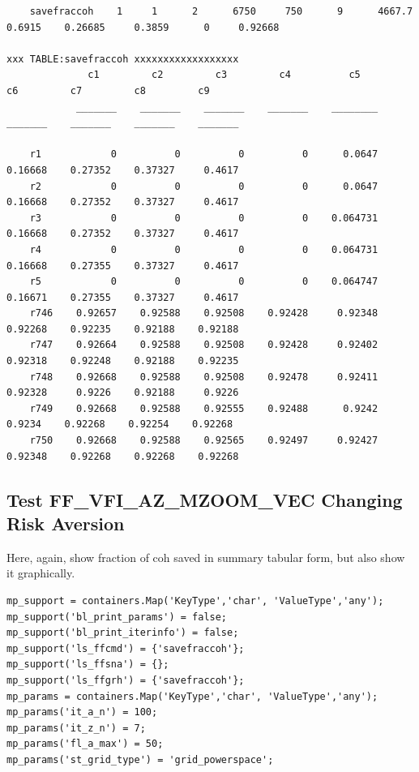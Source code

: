 \documentclass[
]{book}
\begin{document}
\begin{verbatim}
    savefraccoh    1     1      2      6750     750      9      4667.7    0.6915    0.26685     0.3859      0     0.92668

xxx TABLE:savefraccoh xxxxxxxxxxxxxxxxxx
              c1         c2         c3         c4          c5         c6         c7         c8         c9   
            _______    _______    _______    _______    ________    _______    _______    _______    _______

    r1            0          0          0          0      0.0647    0.16668    0.27352    0.37327     0.4617
    r2            0          0          0          0      0.0647    0.16668    0.27352    0.37327     0.4617
    r3            0          0          0          0    0.064731    0.16668    0.27352    0.37327     0.4617
    r4            0          0          0          0    0.064731    0.16668    0.27355    0.37327     0.4617
    r5            0          0          0          0    0.064747    0.16671    0.27355    0.37327     0.4617
    r746    0.92657    0.92588    0.92508    0.92428     0.92348    0.92268    0.92235    0.92188    0.92188
    r747    0.92664    0.92588    0.92508    0.92428     0.92402    0.92318    0.92248    0.92188    0.92235
    r748    0.92668    0.92588    0.92508    0.92478     0.92411    0.92328     0.9226    0.92188     0.9226
    r749    0.92668    0.92588    0.92555    0.92488      0.9242     0.9234    0.92268    0.92254    0.92268
    r750    0.92668    0.92588    0.92565    0.92497     0.92427    0.92348    0.92268    0.92268    0.92268
\end{verbatim}

\hypertarget{test-ff_vfi_az_mzoom_vec-changing-risk-aversion}{%
\subsection{Test FF\_VFI\_AZ\_MZOOM\_VEC Changing Risk Aversion}\label{test-ff_vfi_az_mzoom_vec-changing-risk-aversion}}

Here, again, show fraction of coh saved in summary tabular form, but
also show it graphically.

\begin{verbatim}
mp_support = containers.Map('KeyType','char', 'ValueType','any');
mp_support('bl_print_params') = false;
mp_support('bl_print_iterinfo') = false;
mp_support('ls_ffcmd') = {'savefraccoh'};
mp_support('ls_ffsna') = {};
mp_support('ls_ffgrh') = {'savefraccoh'};
mp_params = containers.Map('KeyType','char', 'ValueType','any');
mp_params('it_a_n') = 100;
mp_params('it_z_n') = 7;
mp_params('fl_a_max') = 50;
mp_params('st_grid_type') = 'grid_powerspace';
\end{verbatim}
\end{document}
